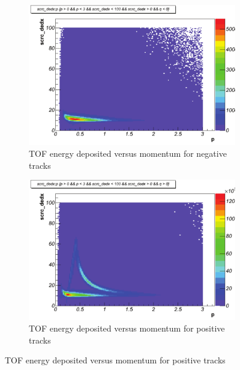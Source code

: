 \begin{figure}\begin{center}
    \begin{subfigure}{0.5\columnwidth}\begin{center}
        \includegraphics[width=.9\linewidth]{figures/calib/tof/Tof_56855_final_dedxm.pdf}
        \caption{TOF energy deposited versus momentum for negative tracks}
        \label{plt:tofEvpneg}
    \end{center}\end{subfigure}\begin{subfigure}{0.5\columnwidth}\begin{center}
        \includegraphics[width=.9\linewidth]{figures/calib/tof/Tof_56855_final_dedxp.pdf}
        \caption{TOF energy deposited versus momentum for positive tracks}
        \label{plt:tofEvppos}
    \end{center}\end{subfigure}
\end{center}\end{figure}

